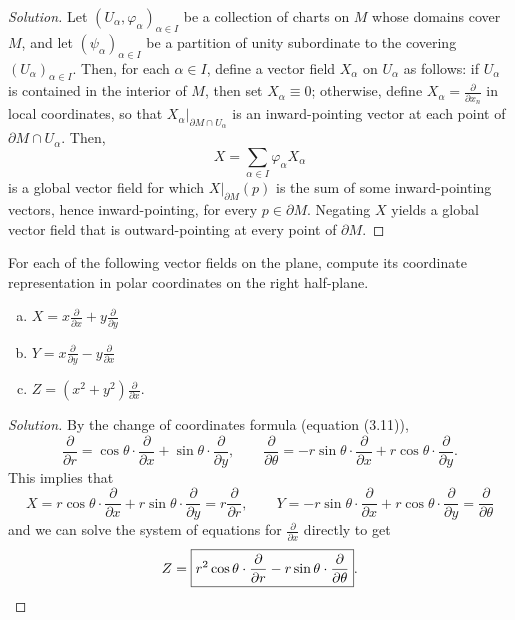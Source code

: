 \documentclass[10pt]{article}
\providecommand{\ii}{\item}
\newenvironment{soln}{\begin{proof}[Solution]}{\end{proof}}
\begin{document}
\begin{soln}
    Let $(U_\alpha,\varphi_\alpha)_{\alpha\in I}$
    be a collection of charts on $M$ whose domains cover $M$,
    and let $(\psi_\alpha)_{\alpha\in I}$ be a partition of unity
    subordinate to the covering $(U_\alpha)_{\alpha\in I}$.
    Then, for each $\alpha\in I$, define a vector field $X_\alpha$
    on $U_\alpha$ as follows: if $U_\alpha$ is contained
    in the interior of $M$, then set $X_\alpha\equiv 0$;
    otherwise, define $X_\alpha = \frac\partial{\partial x_n}$
    in local coordinates, so that $X_\alpha|_{\partial M\cap U_\alpha}$
    is an inward-pointing vector at each point of
    $\partial M\cap U_\alpha$. Then,
    \begin{equation*}
	X = \sum_{\alpha\in I}\varphi_\alpha X_\alpha
    \end{equation*}
    is a global vector field for which $X|_{\partial M}(p)$
    is the sum of some inward-pointing vectors, hence inward-pointing,
    for every $p\in\partial M$.
    Negating $X$ yields a global vector field
    that is outward-pointing at every point of $\partial M$.
\end{soln}

\begin{problem}
    For each of the following vector fields on the plane,
    compute its coordinate representation in
    polar coordinates on the right half-plane.
    \begin{enumerate}[(a)]
	\ii $X = x\frac{\partial}{\partial x}
	+ y\frac{\partial}{\partial y}$
	\ii $Y = x\frac{\partial}{\partial y}
	- y\frac{\partial}{\partial x}$
	\ii $Z = (x^2 + y^2)\frac{\partial}{\partial x}$.
    \end{enumerate}
\end{problem}

\begin{soln}
    By the change of coordinates formula (equation (3.11)),
    \begin{equation*}
	\frac\partial{\partial r}
	= \cos\theta\cdot\frac\partial{\partial x}
	+ \sin\theta\cdot\frac\partial{\partial y},\qquad
	\frac\partial{\partial \theta}
	= -r\sin\theta\cdot\frac\partial{\partial x}
	+ r\cos\theta\cdot\frac\partial{\partial y}.
    \end{equation*}
    This implies that
    \begin{equation*}
        X = r\cos\theta\cdot\frac\partial{\partial x}
	+ r\sin\theta\cdot\frac\partial{\partial y}
	=\boxed{ r\frac{\partial}{\partial r}},\qquad
	Y = -r\sin\theta\cdot\frac\partial{\partial x}
	+ r\cos\theta\cdot\frac\partial{\partial y}
	=\boxed{ \frac\partial{\partial\theta}}
    \end{equation*}
    and we can solve the system of equations
    for $\frac\partial{\partial x}$ directly to get
    \begin{equation*}
	Z = \boxed{r^2\cos\theta\cdot\frac\partial{\partial r}
	- r\sin\theta\cdot\frac\partial{\partial\theta}}.\qedhere
    \end{equation*}
\end{soln}
\end{document}

